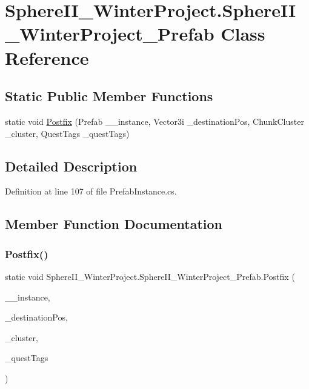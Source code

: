 \hypertarget{class_sphere_i_i___winter_project_1_1_sphere_i_i___winter_project___prefab}{}\section{Sphere\+I\+I\+\_\+\+Winter\+Project.\+Sphere\+I\+I\+\_\+\+Winter\+Project\+\_\+\+Prefab Class Reference}
\label{class_sphere_i_i___winter_project_1_1_sphere_i_i___winter_project___prefab}
\subsection*{Static Public Member Functions}
\begin{DoxyCompactItemize}
\item 
static void \mbox{\hyperlink{class_sphere_i_i___winter_project_1_1_sphere_i_i___winter_project___prefab_a4f215a3776537357f6ed084781e52ad3}{Postfix}} (Prefab \+\_\+\+\_\+instance, Vector3i \+\_\+destination\+Pos, Chunk\+Cluster \+\_\+cluster, Quest\+Tags \+\_\+quest\+Tags)
\end{DoxyCompactItemize}


\subsection{Detailed Description}


Definition at line 107 of file Prefab\+Instance.\+cs.



\subsection{Member Function Documentation}
\mbox{\label{class_sphere_i_i___winter_project_1_1_sphere_i_i___winter_project___prefab_a4f215a3776537357f6ed084781e52ad3}} 
\subsubsection{\texorpdfstring{Postfix()}{Postfix()}}
{\footnotesize\ttfamily static void Sphere\+I\+I\+\_\+\+Winter\+Project.\+Sphere\+I\+I\+\_\+\+Winter\+Project\+\_\+\+Prefab.\+Postfix (\begin{DoxyParamCaption}\item[{Prefab}]{\+\_\+\+\_\+instance,  }\item[{Vector3i}]{\+\_\+destination\+Pos,  }\item[{Chunk\+Cluster}]{\+\_\+cluster,  }\item[{Quest\+Tags}]{\+\_\+quest\+Tags }\end{DoxyParamCaption})\hspace{0.3cm}{\ttfamily [static]}}



